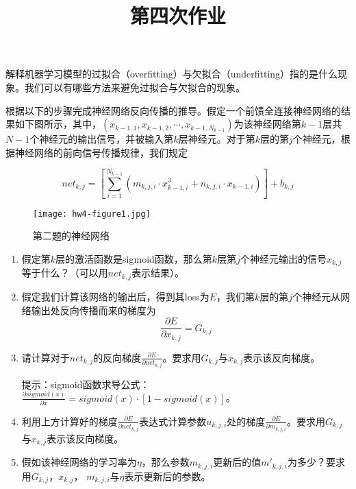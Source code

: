 
    \title{第四次作业}
    \maketitle

    \begin{problem}
        解释机器学习模型的过拟合（overfitting）与欠拟合（underfitting）指的是什么现象。我们可以有哪些方法来避免过拟合与欠拟合的现象。
    \end{problem}

    \begin{solution}
    \end{solution}

    \begin{problem}
根据以下的步骤完成神经网络反向传播的推导。假定一个前馈全连接神经网络的结果如下图所示，其中，$(x_{k-1, 1}, x_{k-1, 2}, \cdots, x_{k-1, N_{k-1}})$为该神经网络第$k-1$层共$N-1$个神经元的输出信号，并被输入第$k$层神经元。对于第$k$层的第$j$个神经元，根据神经网络的前向信号传播规律，我们规定
    \end{problem}
\begin{equation}
    net_{k,j} = [\sum_{i=1}^{N_{k-1}} (m_{k,j,i}\cdot x_{k-1, i}^3 + n_{k, j, i}\cdot x_{k-1, i})] + b_{k, j} 
\end{equation}
\begin{figure}[H]
    \centering
    \texttt{[image: hw4-figure1.jpg]}
    \caption{第二题的神经网络}
\end{figure}

\begin{enumerate}
    \item 假定第$k$层的激活函数是sigmoid函数，那么第$k$层第$j$个神经元输出的信号$x_{k,j}$等于什么？（可以用$net_{k,j}$表示结果）。
    \item 假定我们计算该网络的输出后，得到其loss为$E$，我们第$k$层的第$j$个神经元从网络输出处反向传播而来的梯度为
\begin{equation}
    \frac{\partial E}{\partial x_{k, j}} = G_{k, j}
\end{equation}
    \item 请计算对于$net_{k, j}$的反向梯度$\frac{\partial E}{\partial net_{k, j}}$。要求用$G_{k,j}$与$x_{k,j}$表示该反向梯度。
    
    提示：sigmoid函数求导公式：$\frac{\partial sigmoid(x)}{\partial x} = sigmoid(x)\cdot [1-sigmoid(x)]$。
    \item 利用上方计算好的梯度$\frac{\partial E}{\partial net_{k, j}}$表达式计算参数$u_{k,j,i}$处的梯度$\frac{\partial E}{\partial m_{k,j,i}}$。要求用$G_{k,j}$与$x_{k,j}$表示该反向梯度。
    \item 假如该神经网络的学习率为$\eta$，那么参数$m_{k, j, i}$更新后的值$m'_{k, j, i}$为多少？要求用$G_{k,j}$，$x_{k,j}$， $m_{k, j, i}$与$\eta$表示更新后的参数。
\end{enumerate}

